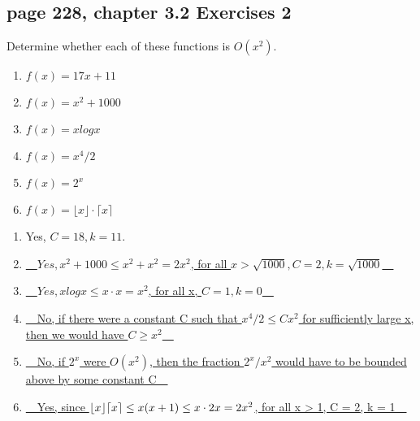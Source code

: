 \documentclass[sigconf]{acmart}
\DeclarePairedDelimiter\ceil{\lceil}{\rceil}
\DeclarePairedDelimiter\floor{\lfloor}{\rfloor}
\begin{document}
\subsection{page 228, chapter 3.2 Exercises 2}
\begin{shaded}
    Determine whether each of these functions is $O(x^2)$.
    \begin{enumerate}[label=(\alph*)]
    	\item $f(x) = 17x + 11$
    	\item $f(x) = x^2 + 1000$
    	\item $f(x) = x log x$
    	\item $f(x) = x^4 / 2$
    	\item $f(x) = 2^x$
    	\item $f(x) = \lfloor x \rfloor \cdot \lceil x \rceil$
    \end{enumerate}
\end{shaded}
\begin{enumerate}[label=(\alph*)]
	\item Yes, $C = 18, k = 11$.
	\item \underline{~~$Yes, x^2+1000 \leq x^2+x^2 = 2x^2$, for all $x > \sqrt{1000}, C = 2, k = \sqrt{1000}$~~}
	\item \underline{~~$Yes, xlogx \leq x \cdot x = x^2$, for all x, $ C = 1, k = 0$~~}
	\item \underline{~~No, if there were a constant C such that $x^4/2 \leq C x^2$ for sufficiently large x, then we would have $ C \geq x^2$~~}
	\item \underline{~~No, if $2^x$ were $O(x^2)$, then the fraction $2^x/x^2$ would have to be bounded above by some constant C~~}
	\item \underline{~~Yes, since $\floor{x}\ceil{x} \leq x(x+1) \leq x \cdot 2x = 2x^2$, for all x > 1, C = 2, k = 1~~}
\end{enumerate}

\begin{comment}
\subsection{page 241, chapter 3.3 Exercises 2}
\begin{shaded}
    Give a big-O estimate for the number additions used in this segment of an algorithm.
    \begin{lstlisting}[language={python}]
        t := 0
        for i := 1 to n
            for j := 1 to n
                t := t + i + j
    \end{lstlisting}
\end{shaded}
The statement $t := t + i + j$ is executed \underline{~~請作答~~} times, so the number of operations is $O(\underline{~~請作答~~})$.
\end{comment} 

\vspace{10cm}
\end{document}
